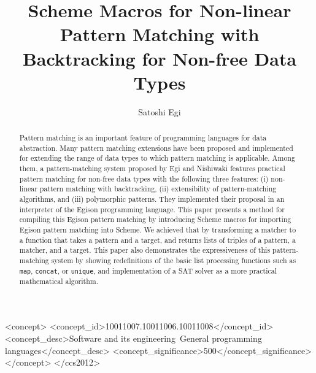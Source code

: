 \documentclass[acmlarge]{acmart}
\begin{document}
\setlength{\pdfpageheight}{\paperheight}
\setlength{\pdfpagewidth}{\paperwidth}

\title{Scheme Macros for Non-linear Pattern Matching with Backtracking for Non-free Data Types}

\author{Satoshi Egi}

\begin{abstract}
  Pattern matching is an important feature of programming languages for data abstraction.
  Many pattern matching extensions have been proposed and implemented for extending the range of data types to which pattern matching is applicable.
  Among them, a pattern-matching system proposed by Egi and Nishiwaki features practical pattern matching for non-free data types with the following three features: (i) non-linear pattern matching with backtracking, (ii) extensibility of pattern-matching algorithms, and (iii) polymorphic patterns.
  They implemented their proposal in an interpreter of the Egison programming language.
  This paper presents a method for compiling this Egison pattern matching by introducing Scheme macros for importing Egison pattern matching into Scheme.
  We achieved that by transforming a matcher to a function that takes a pattern and a target, and returns lists of triples of a pattern, a matcher, and a target.
  This paper also demonstrates the expressiveness of this pattern-matching system by showing redefinitions of the basic list processing functions such as \texttt{map}, \texttt{concat}, or \texttt{unique}, and implementation of a SAT solver as a more practical mathematical algorithm.
  
\end{abstract}

\begin{CCSXML}
<concept>
<concept_id>10011007.10011006.10011008</concept_id>
<concept_desc>Software and its engineering~General programming languages</concept_desc>
<concept_significance>500</concept_significance>
</concept>
</ccs2012>
\end{CCSXML}

\end{document}
